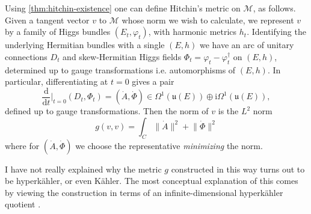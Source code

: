 \documentclass[12pt,letterpaper,reqno]{article}
\numberwithin{equation}{section}
\newcommand{\fu}{{\mathfrak u}}
\newcommand{\cM}{\ensuremath{\mathcal M}}
\newcommand{\kahler}{K\"ahler\xspace}
\newcommand{\hk}{hyperk\"ahler\xspace}
\newcommand{\Hk}{Hyperk\"ahler\xspace}
\newcommand{\I}{{\mathrm i}}
\newcommand{\de}{\mathrm{d}}
\newcommand{\norm}[1]{\lVert#1\rVert}
\newcommand{\ti}[1]{\textit{#1}}
\newcommand{\fixme}[1]{{\color{orange}{[#1]}}}
\begin{document}
Using \autoref{thm:hitchin-existence}
one can define Hitchin's metric on $\cM$, as follows.
Given a tangent vector $v$ to $\cM$ whose norm we wish to calculate, we represent $v$ by a family of Higgs bundles
$(E_t,\varphi_t)$, with harmonic metrics $h_t$.
Identifying the underlying Hermitian bundles with a single $(E,h)$
we have an arc of unitary connections $D_t$ and skew-Hermitian 
Higgs fields $\Phi_t = \varphi_t - \varphi_t^\dagger$ 
on $(E,h)$, determined up to gauge transformations i.e. 
automorphisms of $(E,h)$.
In particular, differentiating at $t = 0$ gives a pair
\begin{equation}
\frac{\de}{\de t}\Bigg\rvert_{t=0} (D_t, \Phi_t) = 
(\dot A, \dot \Phi) \in \Omega^1(\fu(E)) \oplus \I \Omega^{1}(\fu(E)),
\end{equation}
defined up to gauge transformations.
Then the norm of $v$ is the $L^2$ norm
\begin{equation}
  g(v,v) = \int_C \norm{\dot A}^2 + \norm{\dot \Phi}^2
\end{equation}
where for $(\dot A, \dot \Phi)$ we choose the representative
\ti{minimizing} the norm.

\begin{remark}[\Hk quotient] I have not really explained
why the metric $g$ constructed in this way turns out to 
be \hk, or even \kahler. The most conceptual explanation
of this comes by viewing the construction in terms of 
an infinite-dimensional \hk quotient \fixme{cite Hitchin}.
\end{remark}

\end{document}
